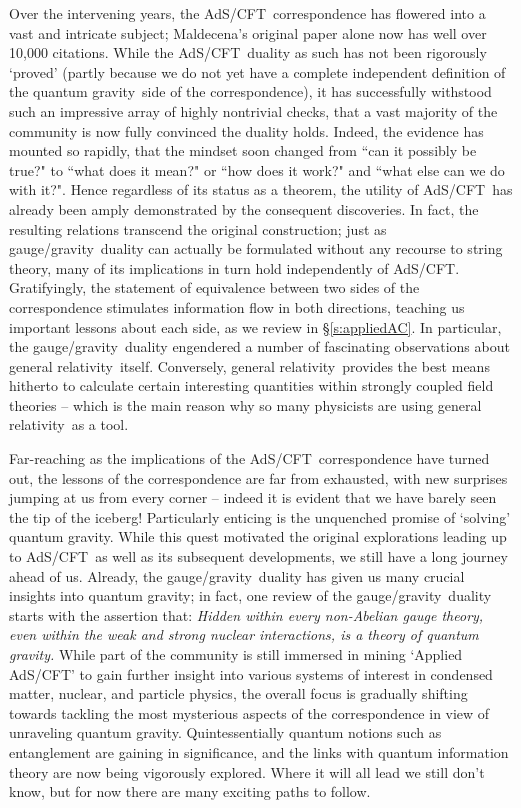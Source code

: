 \documentclass[12pt]{article}
\def\sect#1{\S\ref{#1}}
\def\AC{AdS/CFT}
\def\GG{gauge/gravity}
\def\GR{general relativity}
\def\STY{string theory}
\def\QG{quantum gravity}
\begin{document}
Over the intervening years, the \AC\ correspondence has flowered into a vast and intricate subject; Maldecena's original paper \cite{Maldacena:1997re} alone now has well over 10,000 citations.  While the \AC\ duality as such has not been rigorously `proved' (partly because we do not yet have a complete independent definition of the \QG\  side of the correspondence), it has successfully withstood such an impressive array of highly nontrivial checks, that a vast majority of the community is now  fully convinced the duality holds.  Indeed, the evidence has mounted so rapidly, that the mindset soon changed from ``can it possibly be true?"  to ``what does it mean?" or ``how does it work?" and ``what else can we do with it?".
Hence regardless of its status as a theorem,  the utility of \AC\ has already been amply demonstrated by the consequent discoveries.  In fact, the resulting relations transcend the original construction; just as \GG\ duality can actually be formulated without any recourse to \STY, 
many of its implications in turn hold independently of  \AC.
Gratifyingly, the statement of equivalence between two sides of the correspondence stimulates information flow in both directions, teaching us important lessons about each side, as we review in \sect{s:appliedAC}.  
In particular, the \GG\ duality engendered  a number of fascinating observations about \GR\ itself.
Conversely,  \GR\ provides the best means hitherto 
to calculate certain interesting quantities within strongly coupled field theories -- which is the main reason why so many physicists are using \GR\ as a tool.  

Far-reaching as the implications of the \AC\ correspondence have turned out, the lessons of the correspondence are far from exhausted, with new surprises jumping at us from every corner -- indeed it is evident that we have barely seen the tip of the iceberg!  
Particularly enticing is the unquenched promise of `solving' \QG.  While this quest motivated the original explorations leading up to \AC\ as well as its subsequent developments, we still have a long journey ahead of us.  Already, the \GG\ duality has given us many crucial insights into \QG; in fact,  one review of the \GG\ duality \cite{Horowitz:2006ct} starts with the assertion that: {\it Hidden within every non-Abelian gauge theory, even within the weak and strong nuclear interactions, is a theory of quantum gravity.}  While part of the community is still immersed in mining `Applied \AC' to gain further insight into various systems of interest in condensed matter, nuclear, and particle physics, the overall focus is gradually shifting towards tackling the most mysterious aspects of the correspondence in view of unraveling \QG.  Quintessentially quantum notions such as entanglement are gaining in significance, and the links with quantum information theory are now being vigorously explored.  Where it will all lead we still don't know, but for now there are many exciting paths to follow.
\end{document}

